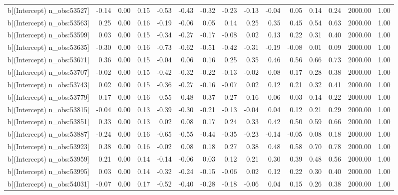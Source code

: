 \begin{table}[ht]
\begin{tabular}{rrrrrrrrrrrrrrr}
  b[(Intercept) n\_obs:53527] & -0.14 & 0.00 & 0.15 & -0.53 & -0.43 & -0.32 & -0.23 & -0.13 & -0.04 & 0.05 & 0.14 & 0.24 & 2000.00 & 1.00 \\ 
  b[(Intercept) n\_obs:53563] & 0.25 & 0.00 & 0.16 & -0.19 & -0.06 & 0.05 & 0.14 & 0.25 & 0.35 & 0.45 & 0.54 & 0.63 & 2000.00 & 1.00 \\ 
  b[(Intercept) n\_obs:53599] & 0.03 & 0.00 & 0.15 & -0.34 & -0.27 & -0.17 & -0.08 & 0.02 & 0.13 & 0.22 & 0.31 & 0.40 & 2000.00 & 1.00 \\ 
  b[(Intercept) n\_obs:53635] & -0.30 & 0.00 & 0.16 & -0.73 & -0.62 & -0.51 & -0.42 & -0.31 & -0.19 & -0.08 & 0.01 & 0.09 & 2000.00 & 1.00 \\ 
  b[(Intercept) n\_obs:53671] & 0.36 & 0.00 & 0.15 & -0.04 & 0.06 & 0.16 & 0.25 & 0.35 & 0.46 & 0.56 & 0.66 & 0.73 & 2000.00 & 1.00 \\ 
  b[(Intercept) n\_obs:53707] & -0.02 & 0.00 & 0.15 & -0.42 & -0.32 & -0.22 & -0.13 & -0.02 & 0.08 & 0.17 & 0.28 & 0.38 & 2000.00 & 1.00 \\ 
  b[(Intercept) n\_obs:53743] & 0.02 & 0.00 & 0.15 & -0.36 & -0.27 & -0.16 & -0.07 & 0.02 & 0.12 & 0.21 & 0.32 & 0.41 & 2000.00 & 1.00 \\ 
  b[(Intercept) n\_obs:53779] & -0.17 & 0.00 & 0.16 & -0.55 & -0.48 & -0.37 & -0.27 & -0.16 & -0.06 & 0.03 & 0.14 & 0.22 & 2000.00 & 1.00 \\ 
  b[(Intercept) n\_obs:53815] & -0.04 & 0.00 & 0.13 & -0.39 & -0.30 & -0.21 & -0.13 & -0.04 & 0.04 & 0.12 & 0.21 & 0.29 & 2000.00 & 1.00 \\ 
  b[(Intercept) n\_obs:53851] & 0.33 & 0.00 & 0.13 & 0.02 & 0.08 & 0.17 & 0.24 & 0.33 & 0.42 & 0.50 & 0.59 & 0.66 & 2000.00 & 1.00 \\ 
  b[(Intercept) n\_obs:53887] & -0.24 & 0.00 & 0.16 & -0.65 & -0.55 & -0.44 & -0.35 & -0.23 & -0.14 & -0.05 & 0.08 & 0.18 & 2000.00 & 1.00 \\ 
  b[(Intercept) n\_obs:53923] & 0.38 & 0.00 & 0.16 & -0.02 & 0.08 & 0.18 & 0.27 & 0.38 & 0.48 & 0.58 & 0.70 & 0.78 & 2000.00 & 1.00 \\ 
  b[(Intercept) n\_obs:53959] & 0.21 & 0.00 & 0.14 & -0.14 & -0.06 & 0.03 & 0.12 & 0.21 & 0.30 & 0.39 & 0.48 & 0.56 & 2000.00 & 1.00 \\ 
  b[(Intercept) n\_obs:53995] & 0.03 & 0.00 & 0.14 & -0.32 & -0.24 & -0.15 & -0.06 & 0.02 & 0.12 & 0.22 & 0.30 & 0.40 & 2000.00 & 1.00 \\ 
  b[(Intercept) n\_obs:54031] & -0.07 & 0.00 & 0.17 & -0.52 & -0.40 & -0.28 & -0.18 & -0.06 & 0.04 & 0.15 & 0.26 & 0.38 & 2000.00 & 1.00 \\ 

\end{tabular}
\end{table}
